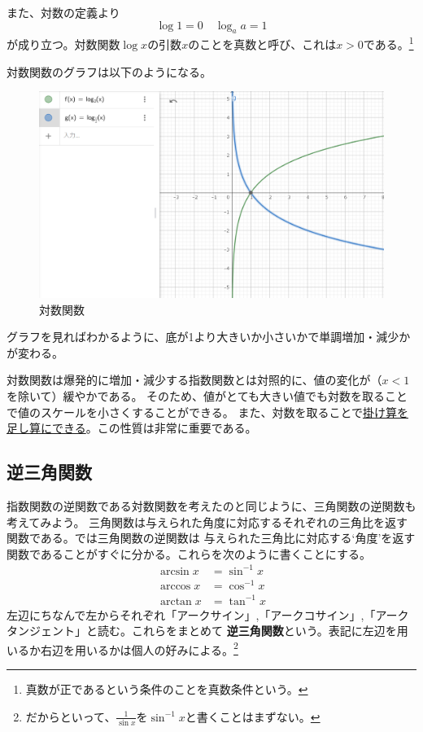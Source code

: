 \documentclass[a4j,dvipdfmx]{jsarticle}
\begin{document}
                また、対数の定義より
                \begin{equation}
                    \log 1 = 0\quad \log_a a = 1
                \end{equation}
                が成り立つ。対数関数$\log x$の引数$x$のことを真数と呼び、これは$x>0$である。\footnote{真数が正であるという条件のことを真数条件という。}

                対数関数のグラフは以下のようになる。

                \begin{figure}[h]
                    \centering
                    \includegraphics[keepaspectratio,scale=0.5]{img/QuuNote/LogFuncGraph.png}
                    \caption{対数関数}
                \end{figure}
                
                グラフを見ればわかるように、底が1より大きいか小さいかで単調増加・減少かが変わる。

                対数関数は爆発的に増加・減少する指数関数とは対照的に、値の変化が（$x<1$を除いて）緩やかである。
                そのため、値がとても大きい値でも対数を取ることで値のスケールを小さくすることができる。
                また、対数を取ることで\underline{掛け算を足し算にできる}。この性質は非常に重要である。
            \clearpage
            \subsection{逆三角関数}
                指数関数の逆関数である対数関数を考えたのと同じように、三角関数の逆関数も考えてみよう。
                三角関数は与えられた角度に対応するそれぞれの三角比を返す関数である。では三角関数の逆関数は
                与えられた三角比に対応する`角度'を返す関数であることがすぐに分かる。これらを次のように書くことにする。
                \begin{align}
                    \arcsin x &= \sin^{-1} x \\
                    \arccos x &= \cos^{-1} x \\
                    \arctan x &= \tan^{-1} x
                \end{align}
                左辺にちなんで左からそれぞれ「アークサイン」,「アークコサイン」,「アークタンジェント」と読む。これらをまとめて
                \textbf{逆三角関数}という。表記に左辺を用いるか右辺を用いるかは個人の好みによる。\footnote{だからといって、$\frac{1}{\sin x}$を$\sin^{-1}x$と書くことはまずない。}
\end{document}
